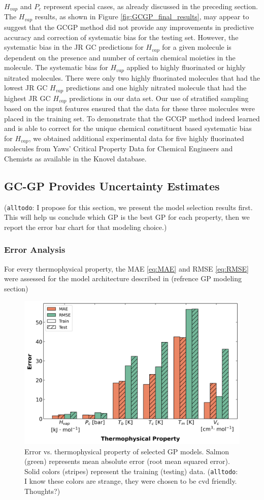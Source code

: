 \documentclass[journal=jacsat,manuscript=article]{achemso}
\newcommand{\alltodo}[1]{{\color{Cyan} (\texttt{alltodo}: #1)}}
\begin{document}
$H_{vap}$ and $P_c$ represent special cases, as already discussed in the preceding section. The $H_{vap}$ results, as shown in Figure \ref{fig:GCGP_final_results}, may appear to suggest that the GCGP method did not provide any improvements in predictive accuracy and correction of systematic bias for the testing set. However, the systematic bias in the JR GC predictions for $H_{vap}$ for a given molecule is dependent on the presence and number of certain chemical moieties in the molecule. The systematic bias for $H_{vap}$ applied to highly fluorinated or highly nitrated molecules. There were only two highly fluorinated molecules that had the lowest JR GC $H_{vap}$ predictions and one highly nitrated molecule that had the highest JR GC $H_{vap}$ predictions in our data set. Our use of stratified sampling based on the input features ensured that the data for these three molecules were placed in the training set. To demonstrate that the GCGP method indeed learned and is able to correct for the unique chemical constituent based systematic bias for $H_{vap}$, we obtained additional experimental data for five highly fluorinated molecules from Yaws' Critical Property Data for Chemical Engineers and Chemists as available in the Knovel database.


\subsection{GC-GP Provides Uncertainty Estimates}
\alltodo{I propose for this section, we present the model selection results first. This will help us conclude which GP is the best GP for each property, then we report the error bar chart for that modeling choice.}

\subsubsection{Error Analysis}
For every thermophysical property, the MAE \eqref{eq:MAE} and RMSE \eqref{eq:RMSE} were assessed for the model architecture described in (refrence GP modeling section)
\begin{figure}
    \centering
    \includegraphics[width=0.75\linewidth]{images/error_bar_chart.png}
    \caption{Error vs. thermophysical property of selected GP models. Salmon (green) represents mean absolute error (root mean squared error). Solid colors (stripes) represent the training (testing) data. \alltodo{I know these colors are strange, they were chosen to be cvd friendly. Thoughts?}}
    \label{fig:enter-label}
\end{figure}
\end{document}
